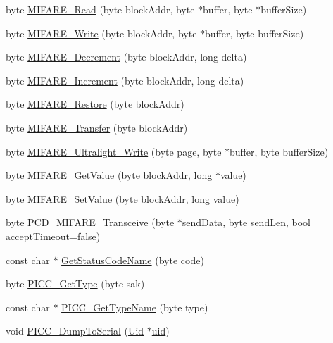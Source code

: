 \begin{DoxyCompactItemize}
byte \hyperlink{class_m_f_r_c522_a05cdd51aa162e37de1a9439b75901e28}{M\+I\+F\+A\+R\+E\+\_\+\+Read} (byte block\+Addr, byte $\ast$buffer, byte $\ast$buffer\+Size)
\item 
byte \hyperlink{class_m_f_r_c522_a6f3c1ba843a2484314c72daf2e7734f0}{M\+I\+F\+A\+R\+E\+\_\+\+Write} (byte block\+Addr, byte $\ast$buffer, byte buffer\+Size)
\item 
byte \hyperlink{class_m_f_r_c522_a1b4732c54686bd32e2dd79cf4b5279e6}{M\+I\+F\+A\+R\+E\+\_\+\+Decrement} (byte block\+Addr, long delta)
\item 
byte \hyperlink{class_m_f_r_c522_aa45713c6d2c8dcf949874abd03f72327}{M\+I\+F\+A\+R\+E\+\_\+\+Increment} (byte block\+Addr, long delta)
\item 
byte \hyperlink{class_m_f_r_c522_aa0f6201f92ae7babab4d37786a12d483}{M\+I\+F\+A\+R\+E\+\_\+\+Restore} (byte block\+Addr)
\item 
byte \hyperlink{class_m_f_r_c522_a36299391c708a71c11c48a94c4e3f3c2}{M\+I\+F\+A\+R\+E\+\_\+\+Transfer} (byte block\+Addr)
\item 
byte \hyperlink{class_m_f_r_c522_aba2c50d4660897d136cf839940299e07}{M\+I\+F\+A\+R\+E\+\_\+\+Ultralight\+\_\+\+Write} (byte page, byte $\ast$buffer, byte buffer\+Size)
\item 
byte \hyperlink{class_m_f_r_c522_a1116cb31c5a64c2be71e3b8649d7865b}{M\+I\+F\+A\+R\+E\+\_\+\+Get\+Value} (byte block\+Addr, long $\ast$value)
\item 
byte \hyperlink{class_m_f_r_c522_a9ae3cc71bcfb52455349683d3685a919}{M\+I\+F\+A\+R\+E\+\_\+\+Set\+Value} (byte block\+Addr, long value)
\item 
byte \hyperlink{class_m_f_r_c522_a638bcf89cd6356cfbc755004a2e62b1c}{P\+C\+D\+\_\+\+M\+I\+F\+A\+R\+E\+\_\+\+Transceive} (byte $\ast$send\+Data, byte send\+Len, bool accept\+Timeout=false)
\item 
const char $\ast$ \hyperlink{class_m_f_r_c522_a63e898d6efcce838b17778403f7003a9}{Get\+Status\+Code\+Name} (byte code)
\item 
byte \hyperlink{class_m_f_r_c522_a1217f49a195799e3c55b388f9d378ab3}{P\+I\+C\+C\+\_\+\+Get\+Type} (byte sak)
\item 
const char $\ast$ \hyperlink{class_m_f_r_c522_aca99128b3a8a192473d0b715a48b9f97}{P\+I\+C\+C\+\_\+\+Get\+Type\+Name} (byte type)
\item 
void \hyperlink{class_m_f_r_c522_a6f324d43c6fbbd0e260b171747186037}{P\+I\+C\+C\+\_\+\+Dump\+To\+Serial} (\hyperlink{struct_m_f_r_c522_1_1_uid}{Uid} $\ast$\hyperlink{class_m_f_r_c522_ad456545d41962dd7f8bd4210f5618498}{uid})

\end{DoxyCompactItemize}
